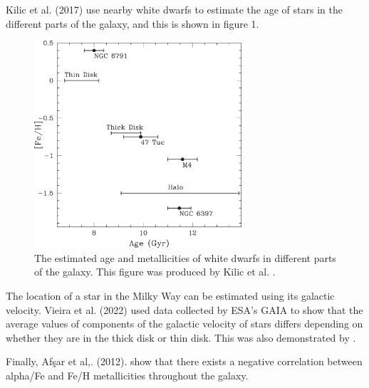 \documentclass[a4paper,twocolumn,12pt]{article}
\begin{document}
Kilic et al. (2017) \cite{MilkyWayMetallicitiesNearbyWDs} use nearby white dwarfs to estimate the age of stars in the different parts of the galaxy, and this is shown in figure 1.
\begin{figure}[h!]
\centering
\includegraphics[width=77mm]{apjaa62a5f10_hr.jpg}
\vspace{-2mm}
\caption{The estimated age and metallicities of white dwarfs in different parts of the galaxy. This figure was produced by Kilic et al. \cite{MilkyWayMetallicitiesNearbyWDs}.}
\label{fig: Age-metallicity for WDs}
\end{figure}

The location of a star in the Milky Way can be estimated using its galactic velocity. Vieira et al. (2022)\cite{ThinAndThickDiskKinematics} used data collected by ESA's GAIA to show that the average values of components of the galactic velocity of stars differs depending on whether they are in the thick disk or thin disk. This was also demonstrated by \cite{ThickDisc}.

Finally, Afşar et al,. (2012)\cite{Afşar}. show that there exists a negative correlation between alpha/Fe and Fe/H metallicities throughout the galaxy. %



\end{document}
